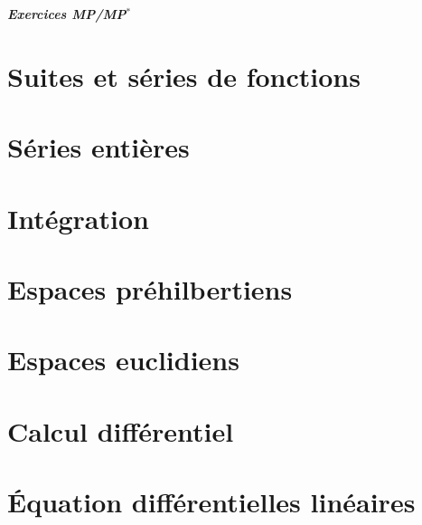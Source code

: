 \documentclass[12pt]{article}
\theoremstyle{remark}
\theoremstyle{remark}
\begin{document}
\begin{titlepage}
	\centering
	\vspace*{\fill}
	\Huge \textit{\textbf{Exercices MP/MP$^*$}}
	\vspace*{\fill}
\end{titlepage}

\cleardoublepage

\tableofcontents









\section{Suites et séries de fonctions}
\section{Séries entières}
\section{Intégration}
\section{Espaces préhilbertiens}
\section{Espaces euclidiens}
\section{Calcul différentiel}
\section{\'Equation différentielles linéaires}
\end{document}

